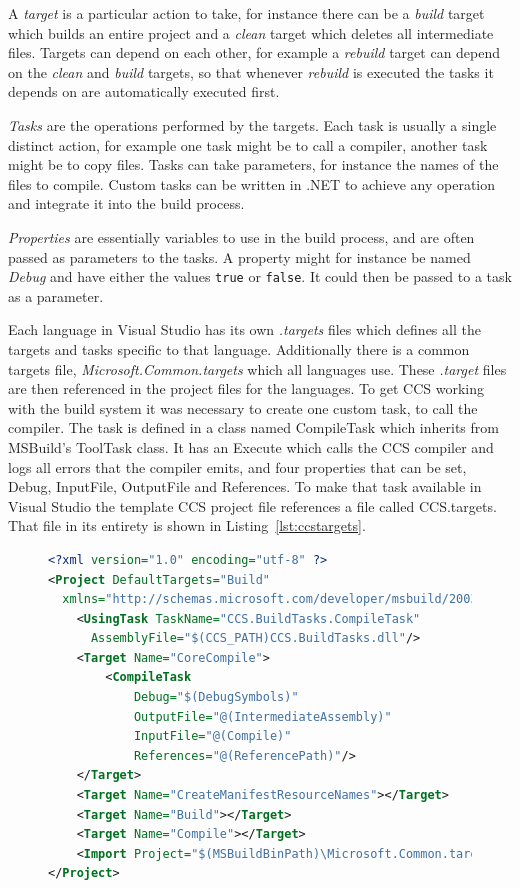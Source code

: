 	A \textit{target} is a particular action to take, for instance there can be 
	a \textit{build} target which builds an entire project and a \textit{clean} 
	target which deletes all intermediate files. Targets can depend on each 
	other, for example a \textit{rebuild} target can depend on the 
	\textit{clean} and \textit{build} targets, so that whenever \textit{rebuild} 
	is executed the tasks it depends on are automatically executed first. 
		
	\textit{Tasks} are the operations performed by the targets. Each task is 
	usually a single distinct action, for example one task might be to call a 
	compiler, another task might be to copy files. Tasks can take parameters, 
	for instance the names of the files to compile. Custom tasks can be written 
	in .NET to achieve any operation and integrate it into the build process.
	
	\textit{Properties} are essentially variables to use in the build process, 
	and are often passed as parameters to the tasks. A property might for 
	instance be named \textit{Debug} and have either the values \texttt{true} or 
	\texttt{false}. It could then be passed to a task as a parameter.
	
	Each language in Visual Studio has its own \textit{.targets} files which 
	defines all the targets and tasks specific to that language. Additionally 
	there is a common targets file, \textit{Microsoft.Common.targets} which all 
	languages use. These \textit{.target} files are then referenced in the 
	project files for the languages. To get CCS working with the build system it 
	was necessary to create one custom task, to call the compiler. The task is 
	defined in a class named \textsf{CompileTask} which inherits from MSBuild's 
	\textsf{ToolTask} class. It has an \textsf{Execute} which calls the CCS 
	compiler and logs all errors that the compiler emits, and four properties 
	that can be set, \textsf{Debug}, \textsf{InputFile}, \textsf{OutputFile} and 
	\textsf{References}. To make that task available in Visual Studio the 
	template CCS project file references a file called \textsf{CCS.targets}. 
	That file in its entirety is shown in Listing~\ref{lst:ccstargets}.
	
	\begin{figure}
	\begin{lstlisting}[caption=The CCS.targets file,label=lst:ccstargets,language=xml,basicstyle=\footnotesize]
<?xml version="1.0" encoding="utf-8" ?>
<Project DefaultTargets="Build" 
  xmlns="http://schemas.microsoft.com/developer/msbuild/2003">
    <UsingTask TaskName="CCS.BuildTasks.CompileTask" 
      AssemblyFile="$(CCS_PATH)CCS.BuildTasks.dll"/>
    <Target Name="CoreCompile">
        <CompileTask 
            Debug="$(DebugSymbols)" 
            OutputFile="@(IntermediateAssembly)" 
            InputFile="@(Compile)" 
            References="@(ReferencePath)"/>
    </Target>
    <Target Name="CreateManifestResourceNames"></Target>
    <Target Name="Build"></Target>
    <Target Name="Compile"></Target>
    <Import Project="$(MSBuildBinPath)\Microsoft.Common.targets" />
</Project>
\end{lstlisting}
\end{figure}
	
